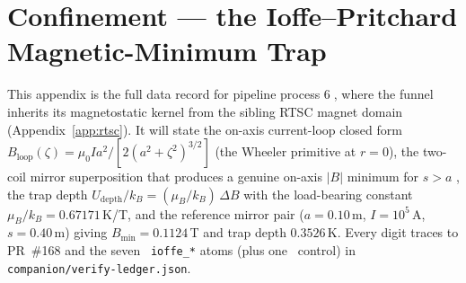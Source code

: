 \section{Confinement --- the Ioffe--Pritchard Magnetic-Minimum Trap}
\label{app:confinement}

This appendix is the full data record for pipeline process
\textcircled{\scriptsize 6}, where the funnel inherits its magnetostatic
kernel from the sibling RTSC magnet domain (Appendix~\ref{app:rtsc}). It will
state the on-axis current-loop closed form
$B_{\mathrm{loop}}(\zeta)=\mu_0 I a^2/[2(a^2+\zeta^2)^{3/2}]$ (the Wheeler
primitive at $r=0$), the two-coil mirror superposition that produces a
genuine on-axis $|B|$ minimum for $s>a$ \citep{andresen2010trapped,amole2014alphatrap},
the trap depth $U_{\mathrm{depth}}/k_B=(\mu_B/k_B)\,\Delta B$ with the
load-bearing constant $\mu_B/k_B=0.67171$\,K/T, and the reference mirror pair
($a=0.10$\,m, $I=10^5$\,A, $s=0.40$\,m) giving $B_{\min}=0.1124$\,T and trap
depth $0.3526$\,K. Every digit traces to PR~\#168 and the seven \tierGreen\
\texttt{ioffe\_*} atoms (plus one \tierRed\ control) in
\texttt{companion/verify-ledger.json}.

